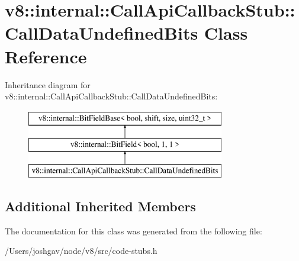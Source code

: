 \hypertarget{classv8_1_1internal_1_1_call_api_callback_stub_1_1_call_data_undefined_bits}{}\section{v8\+:\+:internal\+:\+:Call\+Api\+Callback\+Stub\+:\+:Call\+Data\+Undefined\+Bits Class Reference}
\label{classv8_1_1internal_1_1_call_api_callback_stub_1_1_call_data_undefined_bits}
Inheritance diagram for v8\+:\+:internal\+:\+:Call\+Api\+Callback\+Stub\+:\+:Call\+Data\+Undefined\+Bits\+:\begin{figure}[H]
\begin{center}
\leavevmode
\includegraphics[height=3.000000cm]{classv8_1_1internal_1_1_call_api_callback_stub_1_1_call_data_undefined_bits}
\end{center}
\end{figure}
\subsection*{Additional Inherited Members}


The documentation for this class was generated from the following file\+:\begin{DoxyCompactItemize}
\item 
/\+Users/joshgav/node/v8/src/code-\/stubs.\+h\end{DoxyCompactItemize}
